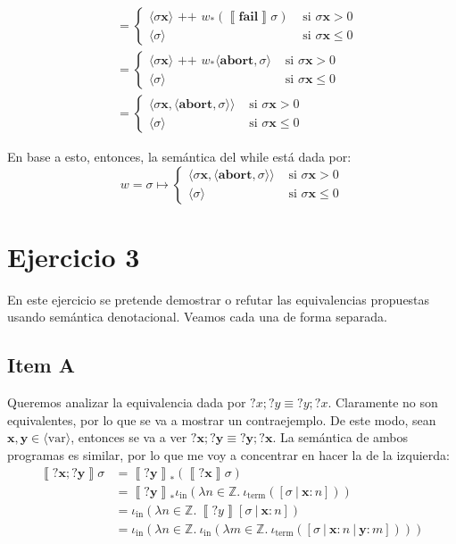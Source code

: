 \documentclass{article}
\newcommand{\aexp}[1]{\langle\text{#1}\rangle}
\newcommand{\var}{\aexp{var}}
\newcommand{\sem}[1]{\left\llbracket #1\right\rrbracket}
\newcommand{\Z}{\mathbb{Z}}
\newcommand{\x}{\textbf{x}}
\newcommand{\y}{\textbf{y}}
\newcommand{\concat}{\texttt{ ++ }}
\newcommand{\cfail}{\textbf{fail}}
\newcommand{\cabort}[1]{\langle\textbf{abort}, #1\rangle}
\newcommand{\cout}[1]{\langle #1\rangle}
\newcommand{\iterm}[1]{\iota_\text{term}\left(#1\right)}
\newcommand{\iin}[2]{\iota_\text{in}\left(\lambda #1 \in \Z .\ #2\right)}
\begin{document}
\begin{equation*}
  \begin{aligned}
    &= \begin{cases}
      \cout{\sigma\x} \concat w_* (\sem{\cfail}\sigma) &\text{ si }\sigma\x > 0 \\ 
      \cout{\sigma} &\text{ si }\sigma\x \leq 0
    \end{cases} \\ 
    &= \begin{cases}
      \cout{\sigma\x} \concat w_* \cabort{\sigma} &\text{ si }\sigma\x > 0 \\ 
      \cout{\sigma} &\text{ si }\sigma\x \leq 0
    \end{cases} \\ 
    &= \begin{cases}
      \cout{\sigma\x, \cabort{\sigma}} &\text{ si }\sigma\x > 0 \\ 
      \cout{\sigma} &\text{ si } \sigma\x \leq 0
    \end{cases}
  \end{aligned}
\end{equation*}

En base a esto, entonces, la semántica del while está dada por:
\begin{equation*}
  w = \sigma \mapsto \begin{cases}
    \cout{\sigma\x, \cabort{\sigma}} &\text{ si }\sigma\x > 0 \\ 
    \cout{\sigma} &\text{ si }\sigma\x \leq 0
  \end{cases}
\end{equation*}

\section*{Ejercicio 3}
En este ejercicio se pretende demostrar o refutar las equivalencias propuestas usando semántica denotacional.
Veamos cada una de forma separada.

\subsection*{Item A}
Queremos analizar la equivalencia dada por $?x; ?y \equiv ?y; ?x$.
Claramente no son equivalentes, por lo que se va a mostrar un contraejemplo.
De este modo, sean $\x, \y \in \var$, entonces se va a ver $?\x; ?\y \equiv ?\y; ?\x$.
La semántica de ambos programas es similar, por lo que me voy a concentrar en hacer la de la izquierda:
\begin{equation*}
  \begin{aligned}
    \sem{?\x; ?\y}\sigma &= \sem{?\y}_* (\sem{?\x}\sigma) \\ 
                         &= \sem{?\y}_* \iin{n}{\iterm{[\sigma\ |\ \x : n]}} \\ 
                         &= \iin{n}{\sem{?y}[\sigma\ |\ \x : n]} \\ 
                         &= \iin{n}{\iin{m}{\iterm{[\sigma\ |\ \x : n\ |\ \y : m]}}}
  \end{aligned}
\end{equation*}
\end{document}
